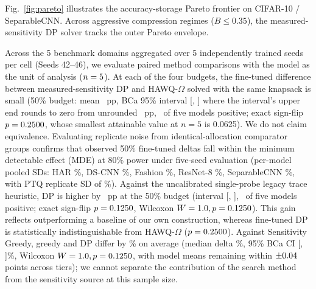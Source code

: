 \documentclass{ieeeaccess}
\begin{document}
Fig.~\ref{fig:pareto} illustrates the accuracy-storage Pareto frontier on CIFAR-10 / SeparableCNN. Across aggressive compression regimes ($B \le 0.35$), the measured-sensitivity DP solver tracks the outer Pareto envelope.

Across the 5 benchmark domains aggregated over 5 independently trained seeds per cell (Seeds 42--46), we evaluate paired method comparisons with the model as the unit of analysis ($n = 5$). At each of the four budgets, the fine-tuned difference between measured-sensitivity DP and HAWQ-$\Omega$ solved with the same knapsack is small (50\% budget: mean \MacroOmegaMeanDelta\ pp, BCa 95\% interval [\MacroOmegaCILow, \MacroOmegaCIHigh] where the interval's upper end rounds to zero from unrounded \MacroOmegaCIHighUnrounded\ pp, \MacroOmegaWins\ of five models positive; exact sign-flip $p = 0.2500$, whose smallest attainable value at $n = 5$ is 0.0625). We do not claim equivalence. Evaluating replicate noise from identical-allocation comparator groups confirms that observed 50\% fine-tuned deltas fall within the minimum detectable effect (MDE) at 80\% power under five-seed evaluation (per-model pooled SDs: HAR \MacroNoiseSDHAR\%, DS-CNN \MacroNoiseSDDSCNN\%, Fashion \MacroNoiseSDFashion\%, ResNet-8 \MacroNoiseSDResNet\%, SeparableCNN \MacroNoiseSDSepCNN\%, with PTQ replicate SD of \MacroNoiseSDPTQ\%). Against the uncalibrated single-probe legacy trace heuristic, DP is higher by \MacroLegacyMeanDelta\ pp at the 50\% budget (interval [\MacroLegacyCILow, \MacroLegacyCIHigh], \MacroLegacyWins\ of five models positive; exact sign-flip $p = 0.1250$, Wilcoxon $W = 1.0, p = 0.1250$). This gain reflects outperforming a baseline of our own construction, whereas fine-tuned DP is statistically indistinguishable from HAWQ-$\Omega$ ($p = 0.2500$). Against Sensitivity Greedy, greedy and DP differ by \MacroBootDPGreedyMeanFT\% on average (median delta \MacroBootDPGreedyMedianFT\%, 95\% BCa CI [\MacroBootDPGreedyCILowFT, \MacroBootDPGreedyCIHighFT]\%, Wilcoxon $W = 1.0, p = 0.1250$, with model means remaining within $\pm0.04$ points across tiers); we cannot separate the contribution of the search method from the sensitivity source at this sample size.
\end{document}
